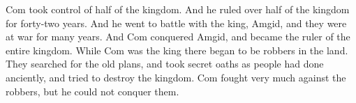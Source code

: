 Com took control of half of the kingdom. And he ruled over half of the kingdom for forty-two years. And he went to battle with the king, Amgid, and they were at war for many years. And Com conquered Amgid, and became the ruler of the entire kingdom.
\bverse \iffalse And in the days of Com there began to be robbers in the land; and they adopted the old plans, and administered oaths after the manner of the ancients, and sought again to destroy the kingdom. \fi
While Com was the king there began to be robbers in the land. They searched for the old plans, and took secret oaths as people had done anciently, and tried to destroy the kingdom.
\bverse \iffalse Now Com did fight against them much; nevertheless, he did not prevail against them. \fi
Com fought very much against the robbers, but he could not conquer them.


